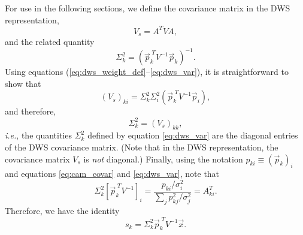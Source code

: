 \documentclass[10pt]{article}
\newcommand{\pvecT}{\vec{p}_k^{\;T}}
\newcommand{\dws}{{\small DWS}}
\begin{document}
For use in the following sections, we define the covariance matrix in the \dws{} representation,
\begin{equation}
V_s = A^T V A, \label{eq:dws_covar}
\end{equation}
and the related quantity
\begin{equation}
\Sigma_k^2 = (\pvecT V^{-1} \vec{p}_k)^{-1}. \label{eq:dws_var}
\end{equation}
Using equations (\ref{eq:dws_weight_def}--\ref{eq:dws_var}), it is straightforward to show that 
\begin{equation}
\label{eq:dws_var_identity}
(V_s)_{ki} = \Sigma^2_k \Sigma^2_i \left( \pvecT V^{-1} \vec{p}_i \right),
\end{equation}
and therefore,
\begin{equation}
\Sigma_k^2 = (V_s)_{kk},
\end{equation}
\emph{i.e.}, the quantities $\Sigma_k^2$ defined by equation \eqref{eq:dws_var} are the diagonal entries of the \dws{} covariance matrix.  (Note that in the \dws{} representation, the covariance matrix $V_s$ is \emph{not} diagonal.)
Finally, using the notation $p_{ki} \equiv (\vec{p}_k)_i$ and equations \eqref{eq:cam_covar} and \eqref{eq:dws_var}, note that
\begin{equation}
\Sigma_k^2 \left[\pvecT V^{-1}\right]_i = \frac{p_{ki} / \sigma^2_i}{\sum_j{p_{kj}^2/\sigma_j^2}} = A^T_{ki}. \label{eq:dws_weight_id}
\end{equation}
Therefore, we have the identity
\begin{equation}
s_k = \Sigma_k^2 \pvecT  V^{-1} \vec{x}. \label{eq:dws_identity}
\end{equation}

\end{document}
